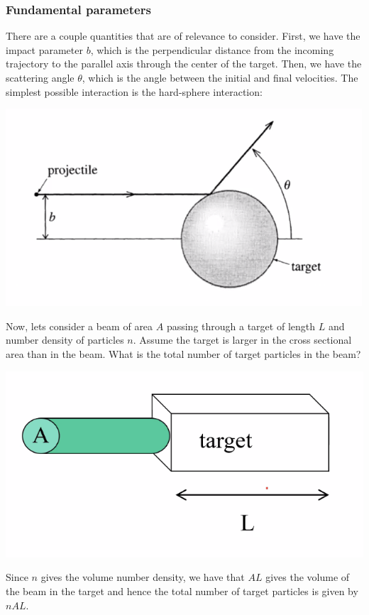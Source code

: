 \documentclass[../PHYS306Notes.tex]{subfiles}
\begin{document}
\subsubsection{Fundamental parameters}
There are a couple quantities that are of relevance to consider. First, we have the impact parameter $b$, which is the perpendicular distance from the incoming trajectory to the parallel axis through the center of the target. Then, we have the scattering angle $\theta$, which is the angle between the initial and final velocities. The simplest possible interaction is the hard-sphere interaction:
\begin{center}
    \includegraphics[scale=0.8]{Lecture-27/l27-img3.png}
\end{center}
Now, lets consider a beam of area $A$ passing through a target of length $L$ and number density of particles $n$. Assume the target is larger in the cross sectional area than in the beam. What is the total number of target particles in the beam?
\begin{center}
    \includegraphics[scale=0.7]{Lecture-27/l27-img4.png}
\end{center}
\begin{s}
Since $n$ gives the volume number density, we have that $AL$ gives the volume of the beam in the target and hence the total number of target particles is given by $nAL$.
\end{s}
\end{document}
